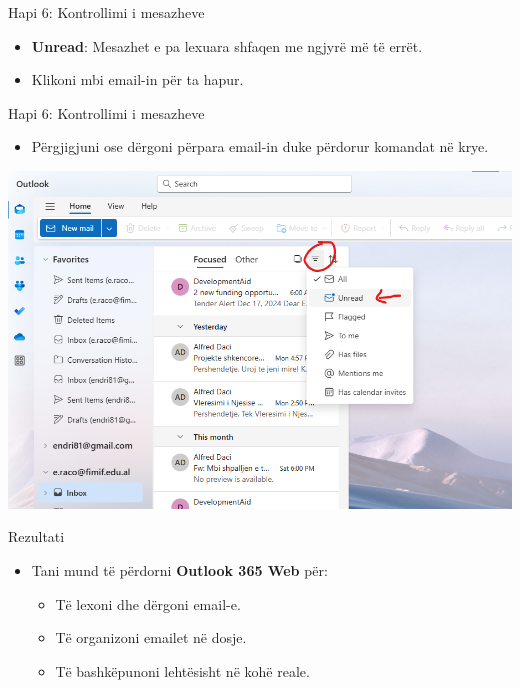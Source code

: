 \documentclass[
  ignorenonframetext,
]{beamer}
\providecommand{\tightlist}{%
  \setlength{\itemsep}{0pt}\setlength{\parskip}{0pt}}
\begin{document}
\begin{frame}{Hapi 6: Kontrollimi i mesazheve}
\label{hapi-6-kontrollimi-i-mesazheve}
\begin{itemize}
\item
  \textbf{Unread}: Mesazhet e pa lexuara shfaqen me ngjyrë më të errët.
\item
  Klikoni mbi email-in për ta hapur.
\end{itemize}
\end{frame}

\begin{frame}{Hapi 6: Kontrollimi i mesazheve}
\label{hapi-6-kontrollimi-i-mesazheve-1}
\begin{itemize}
\tightlist
\item
  Përgjigjuni ose dërgoni përpara email-in duke përdorur komandat në
  krye.
\end{itemize}

\includegraphics{./images/outlook6.png}
\end{frame}

\begin{frame}{Rezultati}
\label{rezultati}
\begin{itemize}
\item
  Tani mund të përdorni \textbf{Outlook 365 Web} për:

  \begin{itemize}
  \item
    Të lexoni dhe dërgoni email-e.
  \item
    Të organizoni emailet në dosje.
  \item
    Të bashkëpunoni lehtësisht në kohë reale.
  \end{itemize}
\end{itemize}
\end{frame}
\end{document}
